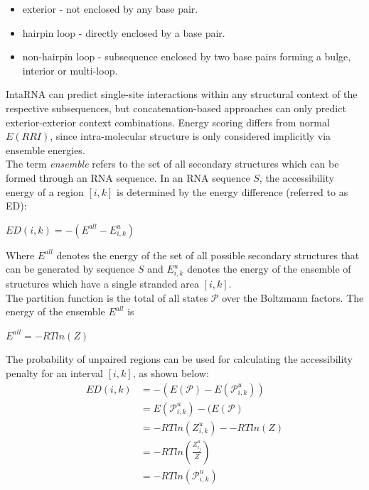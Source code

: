 \documentclass[twoside,a4paper]{report}
\begin{document}
	\begin{itemize}
	\item exterior - not enclosed by any base pair.
	\item hairpin loop - directly enclosed by a base pair.
	\item non-hairpin loop - subsequence enclosed by two base pairs forming a bulge, interior or multi-loop.\\
    \end{itemize}
		
	IntaRNA can predict single-site interactions within any structural context of the respective subsequences, but concatenation-based approaches can only predict exterior-exterior context combinations. Energy scoring differs from normal $E(RRI)$, since intra-molecular structure is only considered implicitly via ensemble energies.\\
	
	The term \textit{ensemble} refers to the set of all secondary structures which can be formed through an RNA sequence. In an RNA sequence $S$, the accessibility energy of a region $[i, k]$ is determined by the energy difference (referred to as ED):
	
	\begin{center}
		$ ED(i,k) = - (E^{all} - E_{i,k}^{u} )$\\
	\end{center}
	
	Where $E^{all}$ denotes the energy of the set of all possible secondary structures that can be generated by sequence $S$ and $E_{i,k}^{u}$ denotes the energy of the ensemble of structures which have a single stranded area $ [i,k]$. \\
	The partition function is the total of all states $\mathcal{P}$ over the Boltzmann factors. The energy of the ensemble $E^{all}$ is 
	
	\begin{center}
		
		$E^{all} = - RTln({Z})$
		
	\end{center}
	The probability of unpaired regions can be used for calculating the accessibility penalty for an interval $[i,k]$, as shown below: \\
	
	\begin{align*}
	ED(i,k) &= - (E(\mathcal{P}) - E(\mathcal{P}_{i,k}^{u}))\\
	&= E(\mathcal{P}_{i,k}^{u}) - (E(\mathcal{P}) \\
	&= - RTln({Z}_{i,k}^{u}) - - RTln({Z})\\
	&= - RTln(\frac{Z^u_{i_j}}{Z})\\
	&= - RTln(\mathcal{P}_{i,k}^{u})\\
	\end{align*}
	
\end{document}
